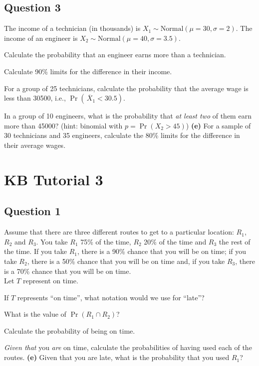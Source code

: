 
\subsection*{Question 3}
The income of a technician (in thousands) is $X_1 \sim \text{Normal}(\mu=30,\sigma=2)$. The income of an engineer is $X_2 \sim \text{Normal}(\mu=40,\sigma=3.5)$. \\[-0.2cm]

\item  Calculate the probability that an engineer earns more than a technician. 
 \item  Calculate 90\% limits for the difference in their income. 
 \item  For a group of 25 technicians, calculate the probability that the average wage is less than 30500, i.e., $\Pr(\,\overline{\!X}_1 < 30.5)$. 
 \item  In a group of 10 engineers, what is the probability that \emph{at least two} of them earn more than 45000? (hint: binomial with $p = \Pr(X_2 > 45)$) 
 {\bf(e)} For a sample of 30 technicians and 35 engineers, calculate the 80\% limits for the difference in their average wages.



\section{KB Tutorial 3}
\subsection*{Question 1}
Assume that there are three different routes to get to a particular location: $R_1$, $R_2$ and $R_3$. You take $R_1$ 75\% of the time, $R_2$ 20\% of the time and $R_3$ the rest of the time. If you take $R_1$, there is a 90\% chance that you will be on time; if you take $R_2$, there is a 50\% chance that you will be on time and, if you take $R_3$, there is a 70\% chance that you will be on time. \\[0.1cm]
Let $T$ represent on time.\\[-0.2cm]

\item  If $T$ represents ``on time'', what notation would we use for ``late''? 
 \item  What is the value of $\Pr(R_1 \cap R_2)$? 
 \item  Calculate the probability of being on time. 
 \item  \emph{Given that} you \emph{are} on time, calculate the probabilities of having used each of the routes. 
 {\bf(e)} Given that you are late, what is the probability that you used $R_1$?




